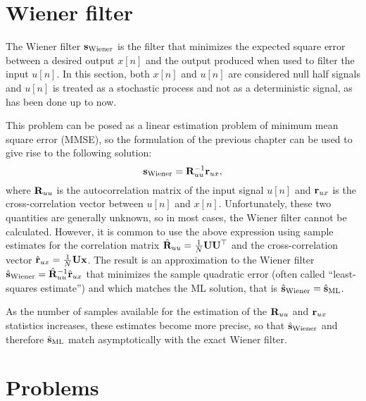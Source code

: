 \section{Wiener filter}

The Wiener filter ${\mathbf s}_\text{Wiener}$ is the filter that minimizes the expected square error between a desired output $x[n]$ and the output produced when used to filter the input $u[n]$. In this section, both $x[n]$ and $u[n]$ are considered null half signals and $u[n]$ is treated as a stochastic process and not as a deterministic signal, as has been done up to now.

This problem can be posed as a linear estimation problem of minimum mean square error (MMSE), so the formulation of the previous chapter can be used to give rise to the following solution:
\begin{equation}
{\mathbf s}_\text{Wiener} = {\mathbf R}_{uu}^{-1}{\mathbf r}_{ux},
\end{equation}
where ${\mathbf R}_{uu}$ is the autocorrelation matrix of the input signal $u[n]$ and ${\mathbf r}_{ux}$ is the cross-correlation vector between $u[n]$ and $x[n]$. Unfortunately, these two quantities are generally unknown, so in most cases, the Wiener filter cannot be calculated. However, it is common to use the above expression using sample estimates for the correlation matrix $\hat{\mathbf R}_{uu} = \tfrac{1}{N} {\mathbf U} {\mathbf U}^\top $ and the cross-correlation vector $\hat {\mathbf r}_{ux} = \tfrac{1}{N} {\mathbf U} {\mathbf x}$. The result is an approximation to the Wiener filter $\hat{{\mathbf s}}_\text{Wiener} = \hat{\mathbf R}_{uu}^{-1}\hat {\mathbf r}_{ux}$ that minimizes the sample quadratic error (often called ``least-squares estimate'') and which matches the ML solution, that is $\hat{{\mathbf s}}_\text{Wiener} = \hat {{\mathbf s}}_\text{ML}$.

As the number of samples available for the estimation of the ${\mathbf R}_{uu}$ and ${\mathbf r}_{ux}$ statistics increases, these estimates become more precise, so that $\hat{{\mathbf s}}_\text {Wiener}$ and therefore $\hat{{\mathbf s}}_\text{ML}$ match asymptotically with the exact Wiener filter.


\section{Problems}

